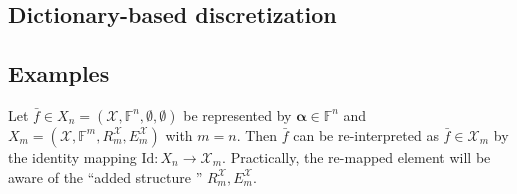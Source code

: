 \documentclass[a4paper]{paper}
\newcommand*{\SPC}[1]{{\ensuremath{\mathscr{#1}}}}
\newcommand*{\SPCX}{\SPC{X}}
\newcommand{\FIELD}{{\ensuremath{\mathbb{F}}}}
\newcommand*{\Fn}{{\ensuremath{\FIELD^n}}}
\newcommand*{\Fm}{{\ensuremath{\FIELD^m}}}
\newcommand*{\OP}[1]{{\ensuremath{\mathcal{#1}}}}
\newcommand*{\OPID}{\OP{\mathrm{Id}}}
\newcommand*{\EXT}[2]{\ensuremath{E_{#1}^{#2}}}
\newcommand*{\REST}[2]{\ensuremath{R_{#1}^{#2}}}
\newcommand*{\RmX}{{\ensuremath{\REST{m}{\SPC{X}}}}}
\newcommand*{\EmX}{{\ensuremath{\EXT{m}{\SPC{X}}}}}
\newcommand{\valpha}{\boldsymbol{\alpha}}
\begin{document}
\subsection{Dictionary-based discretization}
\label{subsec:soft:dict}



\subsection{Examples}
\label{subsec:soft:examp}

\begin{example}[Re-interpretation]
 Let $\bar f \in X_n = (\SPCX, \Fn, \emptyset, \emptyset)$ be represented by $\valpha \in \Fn$ and 
 $X_m = (\SPCX, \Fm, \RmX, \EmX)$ with $m=n$. Then $\bar f$ can be re-interpreted as $\bar f \in \SPCX_m$ by 
 the identity mapping $\OPID \colon X_n \to \SPCX_m$. Practically, the re-mapped element will be aware of the ``added 
 structure '' $\RmX, \EmX$.
\end{example}
\end{document}
